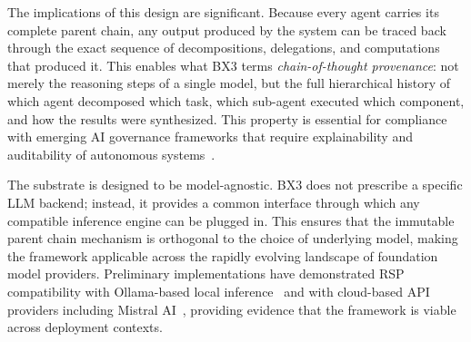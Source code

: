 The implications of this design are significant. Because every agent carries its complete parent chain, any output produced by the system can be traced back through the exact sequence of decompositions, delegations, and computations that produced it. This enables what BX3 terms \emph{chain-of-thought provenance}: not merely the reasoning steps of a single model, but the full hierarchical history of which agent decomposed which task, which sub-agent executed which component, and how the results were synthesized. This property is essential for compliance with emerging AI governance frameworks that require explainability and auditability of autonomous systems~\cite{eu2024aiact, NIST-AI-2023}.

The substrate is designed to be model-agnostic. BX3 does not prescribe a specific LLM backend; instead, it provides a common interface through which any compatible inference engine can be plugged in. This ensures that the immutable parent chain mechanism is orthogonal to the choice of underlying model, making the framework applicable across the rapidly evolving landscape of foundation model providers. Preliminary implementations have demonstrated RSP compatibility with Ollama-based local inference~\cite{ollama2024} and with cloud-based API providers including Mistral AI~\cite{mistral2024}, providing evidence that the framework is viable across deployment contexts.
